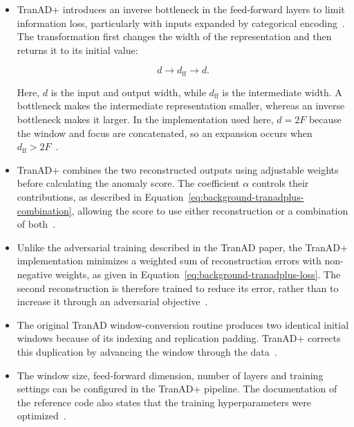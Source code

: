 \begin{itemize}

  \item TranAD+ introduces an inverse bottleneck in the feed-forward
  layers to limit information loss, particularly with inputs expanded
  by categorical encoding~\cite{Yermakov2025TranADPlus}.
  The transformation first changes the width of the representation
  and then returns it to its initial value:

  \begin{equation}
    d \longrightarrow d_{\mathrm{ff}} \longrightarrow d.
    \label{eq:background-bottleneck}
  \end{equation}

  Here, $d$ is the input and output width, while $d_{\mathrm{ff}}$
  is the intermediate width. A bottleneck makes the intermediate
  representation smaller, whereas an inverse bottleneck makes it
  larger. In the implementation used here, $d=2F$ because the window
  and focus are concatenated, so an expansion occurs when
  $d_{\mathrm{ff}}>2F$~\cite{TranADPlusReferenceCode}.

  \item TranAD+ combines the two reconstructed outputs using
  adjustable weights before calculating the anomaly score.
  The coefficient $\alpha$ controls their contributions, as described
  in Equation~\eqref{eq:background-tranadplus-combination}, allowing
  the score to use either reconstruction or a combination of
  both~\cite{Yermakov2025TranADPlus,TranADPlusReferenceCode}.

  \item Unlike the adversarial training described in the TranAD
  paper, the TranAD+ implementation minimizes a weighted sum
  of reconstruction errors with non-negative weights, as given
  in Equation~\eqref{eq:background-tranadplus-loss}.
  The second reconstruction is therefore trained to reduce its
  error, rather than to increase it through an adversarial
  objective~\cite{Tuli2022TranAD,TranADPlusReferenceCode}.

  \item The original TranAD window-conversion routine produces
  two identical initial windows because of its indexing and
  replication padding. TranAD+ corrects this duplication by
  advancing the window through the
  data~\cite{TranADReferenceCode,TranADPlusReferenceCode}.

  \item The window size, feed-forward dimension, number of layers
  and training settings can be configured in the TranAD+ pipeline.
  The documentation of the reference code also states that the training
  hyperparameters were optimized~\cite{TranADPlusReferenceCode}.

\end{itemize}

